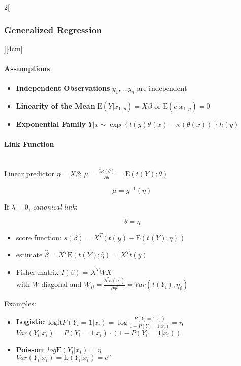 \documentclass[8pt]{extarticle}
\begin{document}
\begin{multicols}{2}[\subsubsection{Generalized Regression}][4cm]

\paragraph{Assumptions}
\begin{itemize}
\item \textbf{Independent Observations} $y_1,...y_n$ are independent
\item \textbf{Linearity of the Mean} $\mathrm{E}(Y|x_{1:p})= X\beta$ or $\mathrm{E}(e|x_{1:p})= 0$ 
\item \textbf{Exponential Family} $ Y|x \sim \exp\left\{t(y)\theta(x) - \kappa(\theta(x))\right\}h(y)$
\end{itemize}

\paragraph{Link Function} \ \\

\noindent Linear predictor $\eta = X\beta$; $\mu = \frac{\partial \kappa(\theta)}{\partial \theta}= \mathrm{E}(t(Y);\theta)$

$$\mu = g^{-1}(\eta)$$

If $\lambda = 0$, \textit{canonical link}:

$$\theta = \eta$$

\begin{itemize}
\item score function: $s(\beta) = X^T\left(t(y) - \mathrm{E}(t(Y);\eta)\right)$
\item estimate $\hat{\beta} =X^T\mathrm{E}(t(Y);\hat{\eta}) = X^Tt(y)$
\item Fisher matrix $I(\beta) = X^TWX$ \\with $W$ diagonal and $W_{ii} = \frac{\partial^2 \kappa(\eta_i)}{\partial \eta^2} = Var(t(Y_i), \eta_i)$
\end{itemize}

\noindent Examples:
\begin{itemize}
\item \textbf{Logistic}: $\text{logit} P(Y_i{=}1|x_i) = \log\frac{P(Y_i{=}1|x_i)}{1{-}P(Y_i{=}1|x_i)} = \eta$ \\
$Var(Y_i|x_i) = P(Y_i{=}1|x_i)\cdot(1{-}P(Y_i{=}1|x_i))$

\item \textbf{Poisson}: $log \mathrm{E}(Y_i|x_i) = \eta$ \\
$Var(Y_i|x_i) = \mathrm{E}(Y_i|x_i) = e^{\eta}$
\end{itemize}


\end{multicols}
\end{document}
